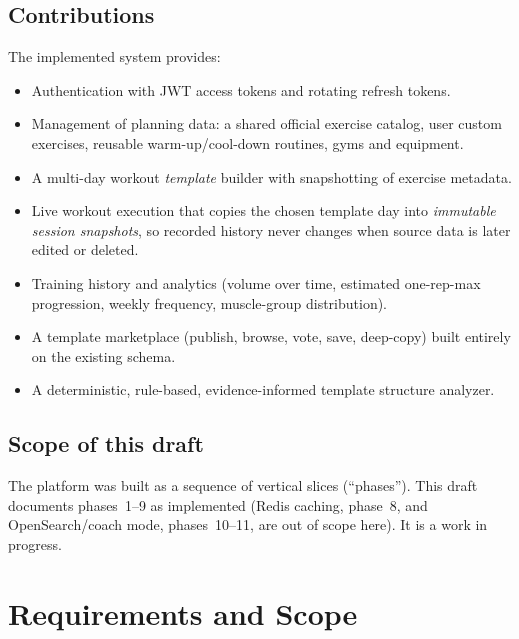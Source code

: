 \documentclass[11pt,a4paper]{article}
\begin{document}
\subsection{Contributions}
The implemented system provides:
\begin{itemize}[noitemsep]
  \item Authentication with JWT access tokens and rotating refresh tokens.
  \item Management of planning data: a shared official exercise catalog, user custom exercises,
        reusable warm-up/cool-down routines, gyms and equipment.
  \item A multi-day workout \emph{template} builder with snapshotting of exercise metadata.
  \item Live workout execution that copies the chosen template day into \emph{immutable session
        snapshots}, so recorded history never changes when source data is later edited or deleted.
  \item Training history and analytics (volume over time, estimated one-rep-max progression,
        weekly frequency, muscle-group distribution).
  \item A template marketplace (publish, browse, vote, save, deep-copy) built entirely on the
        existing schema.
  \item A deterministic, rule-based, evidence-informed template structure analyzer.
\end{itemize}

\subsection{Scope of this draft}
The platform was built as a sequence of vertical slices (``phases''). This draft documents
phases~1--9 as implemented (Redis caching, phase~8, and OpenSearch/coach mode, phases~10--11,
are out of scope here). It is a work in progress.

\section{Requirements and Scope}
\end{document}
